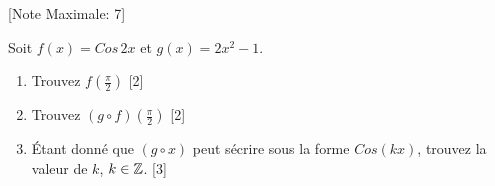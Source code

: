 \begin{question}
  \hspace*{\fill} [Note Maximale: 7]\par
  \medskip
  \noindent Soit $f(x) = Cos\,2x$ et $g(x) = 2x^2 - 1$.\par
  \medskip
  \begin{enumerate}[label=\alph*)]
    \item Trouvez $f\left(\frac{\pi}{2}\right)$\hspace*{\fill} [2]
    \item Trouvez $(g \circ f)\left(\frac{\pi}{2}\right)$\hspace*{\fill} [2]
    \item Étant donné que $(g \circ x)$ peut sécrire sous la forme $Cos(kx)$, trouvez la valeur de $k$, $k \in \mathbb{Z}$.\hspace*{\fill} [3]
  \end{enumerate}
\end{question}
